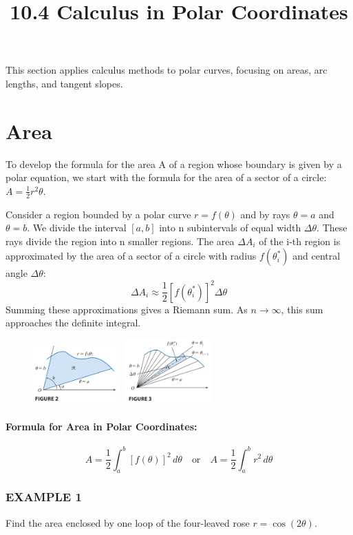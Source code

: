 \documentclass{article}
\title{10.4 Calculus in Polar Coordinates}
\date{}
\author{}
\begin{document}
\maketitle
This section applies calculus methods to polar curves, focusing on areas, arc lengths, and tangent slopes.

\section*{Area}
To develop the formula for the area A of a region whose boundary is given by a polar equation, we start with the formula for the area of a sector of a circle: $A = \frac{1}{2} r^2\theta$.

Consider a region bounded by a polar curve $r = f(\theta)$ and by rays $\theta = a$ and $\theta = b$. We divide the interval $[a,b]$ into n subintervals of equal width $\Delta\theta$. These rays divide the region into n smaller regions. The area $\Delta A_i$ of the i-th region is approximated by the area of a sector of a circle with radius $f(\theta_i^*)$ and central angle $\Delta\theta$:
\[
\Delta A_i \approx \frac{1}{2} [f(\theta_i^*)]^2 \Delta\theta
\]
Summing these approximations gives a Riemann sum. As $n \to \infty$, this sum approaches the definite integral.
\begin{figure}[htbp]
    \centering
    \includegraphics[width=0.3\textwidth]{graph44.png}
    \includegraphics[width=0.3\textwidth]{graph45.png}
\end{figure}

\paragraph{Formula for Area in Polar Coordinates:}
\[
A = \frac{1}{2} \int_{a}^{b} [f(\theta)]^2 \, d\theta \quad \text{or} \quad A = \frac{1}{2} \int_{a}^{b} r^2 \, d\theta
\]

\subsubsection*{EXAMPLE 1}
Find the area enclosed by one loop of the four-leaved rose $r = \cos(2\theta)$.
\end{document}
